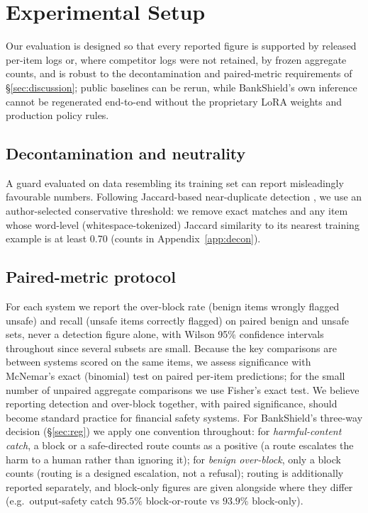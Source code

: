 \documentclass[11pt]{article}
\begin{document}
\section{Experimental Setup}
\label{sec:setup}

Our evaluation is designed so that every reported figure is supported by released per-item logs or, where competitor logs were not retained, by frozen aggregate counts, and is robust to the decontamination and paired-metric requirements of \S\ref{sec:discussion}; public baselines can be rerun, while BankShield's own inference cannot be regenerated end-to-end without the proprietary LoRA weights and production policy rules.

\subsection{Decontamination and neutrality}
\label{sec:decon}

A guard evaluated on data resembling its training set can report misleadingly favourable numbers. Following Jaccard-based near-duplicate detection \citep{lee2022}, we use an author-selected conservative threshold: we remove exact matches and any item whose word-level (whitespace-tokenized) Jaccard similarity to its nearest training example is at least 0.70 (counts in Appendix~\ref{app:decon}).

\subsection{Paired-metric protocol}
\label{sec:paired}

For each system we report the over-block rate (benign items wrongly flagged unsafe) and recall (unsafe items correctly flagged) on paired benign and unsafe sets, never a detection figure alone, with Wilson 95\% confidence intervals throughout since several subsets are small. Because the key comparisons are between systems scored on the same items, we assess significance with McNemar's exact (binomial) test on paired per-item predictions; for the small number of unpaired aggregate comparisons we use Fisher's exact test. We believe reporting detection and over-block together, with paired significance, should become standard practice for financial safety systems. For BankShield's three-way decision (\S\ref{sec:reg}) we apply one convention throughout: for \emph{harmful-content catch}, a block or a safe-directed route counts as a positive (a route escalates the harm to a human rather than ignoring it); for \emph{benign over-block}, only a block counts (routing is a designed escalation, not a refusal); routing is additionally reported separately, and block-only figures are given alongside where they differ (e.g.\ output-safety catch $95.5\%$ block-or-route vs $93.9\%$ block-only).
\end{document}
